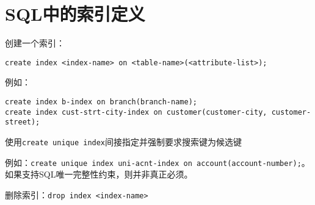 \section{SQL中的索引定义} 

创建一个索引：
\begin{lstlisting}[style=sqlstyle]
create index <index-name> on <table-name>(<attribute-list>);    
\end{lstlisting}

例如：
\begin{lstlisting}[style=sqlstyle]
create index b-index on branch(branch-name);
create index cust-strt-city-index on customer(customer-city, customer-street);    
\end{lstlisting}

使用\texttt{create unique index}间接指定并强制要求搜索键为候选键

例如：\texttt{create unique index uni-acnt-index on account(account-number);}。如果支持SQL唯一完整性约束，则并非真正必须。

删除索引：\texttt{drop index <index-name>}